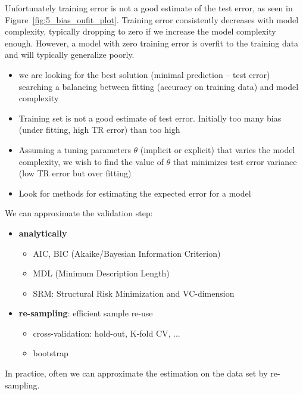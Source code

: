 \documentclass[../main.tex]{subfiles}
\begin{document}
Unfortunately training error is not a good estimate of the test error, as seen in Figure~\ref{fig:5_bias_oufit_plot}. Training error consistently decreases with model complexity, typically dropping to zero if we increase the model complexity enough. However, a model with zero training error is overfit to the training data and will typically generalize poorly.

\begin{itemize}
    \item we are looking for the best solution (minimal prediction – test error) searching a balancing between fitting (accuracy on training data) and model complexity
    
    \item Training set is not a good estimate of test error. Initially too many bias (under fitting, high TR error) than too high
    
    \item Assuming a tuning parameters $\theta$ (implicit or explicit) that varies the model complexity, we wish to find the value of $\theta$ that minimizes test error variance (low TR error but over fitting)
    
    \item Look for methods for estimating the expected error for a model
\end{itemize}

\noindent We can approximate the validation step:
\begin{itemize}
    \item \textbf{analytically}
    \begin{itemize}
        \item AIC, BIC (Akaike/Bayesian Information Criterion)
        \item MDL (Minimum Description Length) 
        \item SRM: Structural Risk Minimization and VC-dimension
    \end{itemize}
    
    \item \textbf{re-sampling}: efficient sample re-use 
    \begin{itemize}
        \item cross-validation: hold-out, K-fold CV, ...
        \item bootstrap
    \end{itemize}
\end{itemize}
In practice, often we can approximate the estimation on the data set by re-sampling.
\end{document}
